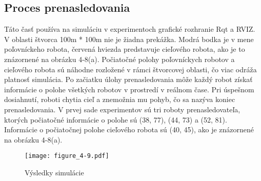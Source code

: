 \subsection{Proces prenasledovania} 
Táto časť používa na simuláciu v experimentoch grafické rozhranie Rqt a RVIZ. V oblasti štvorca 100m * 100m nie je žiadna prekážka. Modrá bodka je v mene poľovníckeho robota, červená hviezda predstavuje cieľového robota, ako je to znázornené na obrázku 4-8(a). Počiatočné polohy poľovníckych robotov a cieľového robota sú náhodne rozložené v rámci štvorcovej oblasti, čo viac odráža platnosť simulácia. Po začiatku úlohy prenasledovania môže každý robot získať informácie o polohe všetkých robotov v prostredí v reálnom čase. Pri úspešnom dosiahnutí, roboti chytia cieľ a znemožnia mu pohyb, čo sa nazýva koniec prenasledovania.
V prvej sade experimentov sú tri roboty prenasledovateľa, ktorých počiatočné informácie o polohe sú (38, 77), (44, 73) a (52, 81). Informácie o počiatočnej polohe cieľového robota sú (40, 45), ako je znázornené na obrázku 4-8(a).
\begin{figure}[ht!]
    \centering
    \texttt{[image: figure\_4-9.pdf]}
    \caption{Výsledky simulácie}
    \label{o:44}
\end{figure}

